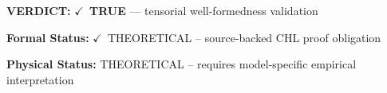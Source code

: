 \textbf{VERDICT:} \ensuremath{\checkmark}\ \textbf{TRUE} --- tensorial well-formedness validation

\textbf{Formal Status:} \ensuremath{\checkmark}\ THEORETICAL -- source-backed CHL proof obligation

\textbf{Physical Status:} THEORETICAL -- requires model-specific empirical interpretation
\par\vspace{0.45em}
\par
\ifTZPDarkEdition
{}
\fi
\endgroup
\endgroup

